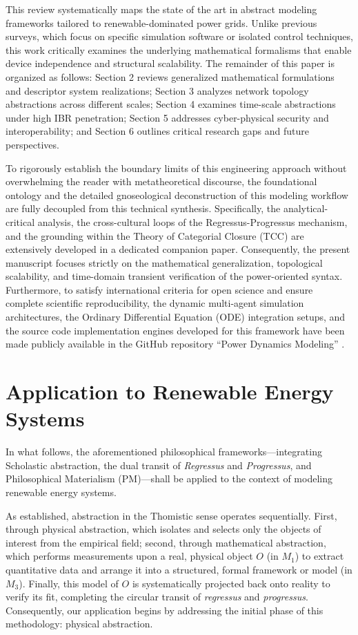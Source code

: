 \documentclass[energies,accept,oneauthor,pdftex]{Definitions/mdpi}
\begin{document}
This review systematically maps the state of the art in abstract modeling frameworks tailored to renewable-dominated power grids. Unlike previous surveys, which focus on specific simulation software or isolated control techniques, this work critically examines the underlying mathematical formalisms that enable device independence and structural scalability. The remainder of this paper is organized as follows: Section 2 reviews generalized mathematical formulations and descriptor system realizations; Section 3 analyzes network topology abstractions across different scales; Section 4 examines time-scale abstractions under high IBR penetration; Section 5 addresses cyber-physical security and interoperability; and Section 6 outlines critical research gaps and future perspectives.

To rigorously establish the boundary limits of this engineering approach without overwhelming the reader with metatheoretical discourse, the foundational ontology and the detailed gnoseological deconstruction of this modeling workflow are fully decoupled from this technical synthesis. Specifically, the analytical-critical analysis, the cross-cultural loops of the Regressus-Progressus mechanism, and the grounding within the Theory of Categorial Closure (TCC) are extensively developed in a dedicated companion paper. Consequently, the present manuscript focuses strictly on the mathematical generalization, topological scalability, and time-domain transient verification of the power-oriented syntax. Furthermore, to satisfy international criteria for open science and ensure complete scientific reproducibility, the dynamic multi-agent simulation architectures, the Ordinary Differential Equation (ODE) integration setups, and the source code implementation engines developed for this framework have been made publicly available in the GitHub repository ``Power Dynamics Modeling'' \cite{AbstractModeling2026}.

\section{Application to Renewable Energy Systems}

In what follows, the aforementioned philosophical frameworks—integrating Scholastic abstraction, the dual transit of \textit{Regressus} and \textit{Progressus}, and Philosophical Materialism (PM)—shall be applied to the context of modeling renewable energy systems.

As established, abstraction in the Thomistic sense operates sequentially. First, through physical abstraction, which isolates and selects only the objects of interest from the empirical field; second, through mathematical abstraction, which performs measurements upon a real, physical object $O$ (in $M_1$) to extract quantitative data and arrange it into a structured, formal framework or model (in $M_3$). Finally, this model of $O$ is systematically projected back onto reality to verify its fit, completing the circular transit of \textit{regressus} and \textit{progressus}. Consequently, our application begins by addressing the initial phase of this methodology: physical abstraction.
\end{document}
